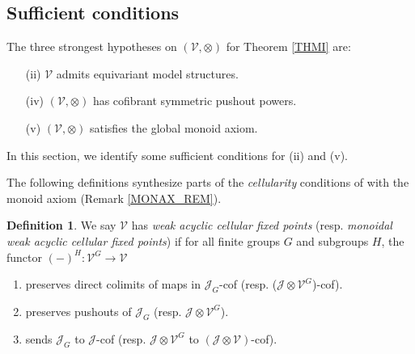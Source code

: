 \documentclass[a4paper,10pt
,draft
]{article}%
\numberwithin{equation}{section}
\numberwithin{figure}{section}
\theoremstyle{definition} %
\newtheorem{definition}[equation]{Definition}%
\newtheorem{remark}[equation]{Remark}%
\newcommand{\F}{\ensuremath{\mathcal F}}
\newcommand{\V}{\ensuremath{\mathcal V}}
\newcommand{\1}{\ensuremath{\mathbbm 1}}%
\begin{document}










\subsection{Sufficient conditions}


The three strongest hypotheses on $(\V, \otimes)$ for Theorem \ref{THMI} are:
\begin{itemize}
\item[(ii)] $\V$ admits equivariant model structures.
\item[(iv)] $(\V, \otimes)$ has cofibrant symmetric pushout powers.
\item[(v)] $(\V,\otimes)$ satisfies the global monoid axiom.
\end{itemize}

In this section, we identify some sufficient conditions for (ii) and (v). 

The following definitions synthesize parts of the \textit{cellularity} conditions of \cite{Ste16} with the monoid axiom (Remark \ref{MONAX_REM}).
\begin{definition}
      We say $\V$ has \textit{weak acyclic cellular fixed points} (resp. \textit{monoidal weak acyclic cellular fixed points}) if
      for all finite groups $G$ and subgroups $H$, the functor $(-)^H \colon \V^G \to \V$
      \begin{enumerate}[label = (\roman*)]
      \item preserves direct colimits of maps in $\mathcal J_G$-cof (resp. ($\mathcal J \otimes \V^G$)-cof).
      \item preserves pushouts of $\mathcal J_G$ (resp. $\mathcal J \otimes \V^G$).
      \item sends $\mathcal J_G$ to $\mathcal J$-cof (resp. $\mathcal J \otimes \V^G$ to $(\mathcal J \otimes \V)$-cof).
      \end{enumerate}
\end{definition}
\end{document}
